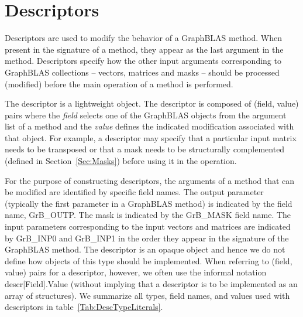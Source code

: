 \section{Descriptors}

Descriptors are used to modify the behavior of a GraphBLAS method.
When present in the signature of a method, they appear as the last argument in the method.
Descriptors specify how the other input arguments
corresponding to GraphBLAS collections -- vectors, matrices and masks -- should
be processed (modified) before the main operation of a method is performed.

The descriptor is a lightweight object.  The descriptor is composed
of (field, value) pairs where the \emph{field} selects one of the GraphBLAS objects
from the argument list of a method and the \emph{value} defines the indicated modification
associated with that object.  For example, a descriptor may specify that a particular 
input matrix needs to be transposed or that a mask needs to be structurally 
complemented (defined in Section~\ref{Sec:Masks}) before using it in the operation.

For the purpose of constructing descriptors, the arguments of a method
that can be modified are identified by specific field names. The output parameter (typically
the first parameter in a GraphBLAS method) is indicated by the field name, 
{\sf GrB\_OUTP}.  The mask is indicated by the {\sf GrB\_MASK} field name. The input parameters
corresponding to the input vectors and matrices are indicated by {\sf GrB\_INP0} and
{\sf GrB\_INP1} in the order they appear in the signature of the GraphBLAS method. 
The descriptor is an opaque object and hence we do not define how objects of this type should
be implemented.   When referring to (field, value) pairs for a descriptor, however, we often use the informal
notation {\sf descr[Field].Value} (without implying that a descriptor is to be implemented as an
array of structures).    We summarize all types, field names, and values used 
with descriptors in table~\ref{Tab:DescTypeLiterals}. 



